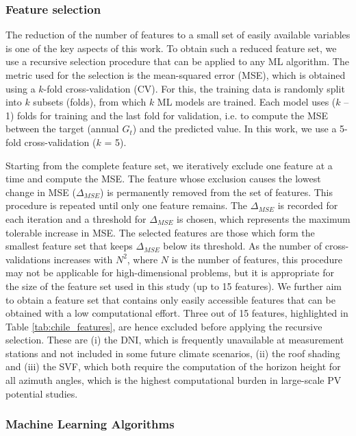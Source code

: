 \subsubsection{Feature selection}
\label{chile_ftrSelect}
The reduction of the number of features to a small set of easily available variables is one of the key aspects of this work. To obtain such a reduced feature set, we use a recursive selection procedure that can be applied to any ML algorithm. The metric used for the selection is the mean-squared error (MSE), which is obtained using a $k$-fold cross-validation (CV). For this, the training data is randomly split into $k$ subsets (folds), from which $k$ ML models are trained. Each model uses ($k$ – 1) folds for training and the last fold for validation, i.e. to compute the MSE between the target (annual $G_t$) and the predicted value. In this work, we use a 5-fold cross-validation ($k$ = 5). 

Starting from the complete feature set, we iteratively exclude one feature at a time and compute the MSE. The feature whose exclusion causes the lowest change in MSE ($\Delta_{MSE}$) is permanently removed from the set of features. This procedure is repeated until only one feature remains. The $\Delta_{MSE}$ is recorded for each iteration and a threshold for $\Delta_{MSE}$ is chosen, which represents the maximum tolerable increase in MSE. The selected features are those which form the smallest feature set that keeps $\Delta_{MSE}$ below its threshold. As the number of cross-validations increases with $N^2$, where $N$ is the number of features, this procedure may not be applicable for high-dimensional problems, but it is appropriate for the size of the feature set used in this study (up to 15 features). We further aim to obtain a feature set that contains only easily accessible features that can be obtained with a low computational effort. Three out of 15 features, highlighted in Table \ref{tab:chile_features}, are hence excluded before applying the recursive selection. These are (i) the DNI, which is frequently unavailable at measurement stations and not included in some future climate scenarios, (ii) the roof shading and (iii) the SVF, which both require the computation of the horizon height for all azimuth angles, which is the highest computational burden in large-scale PV potential studies. 

\subsubsection{Machine Learning Algorithms}

